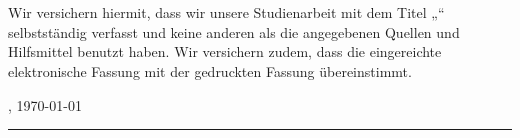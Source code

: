 
\thispagestyle{empty}

\section*{}
\vspace*{2em}

Wir versichern hiermit, dass wir unsere Studienarbeit mit dem Titel „\thesisTitle“ selbstständig verfasst und keine anderen als die angegebenen Quellen und Hilfsmittel benutzt haben. Wir versichern zudem, dass die eingereichte elektronische Fassung mit der gedruckten Fassung übereinstimmt.

\vspace{3em}

\companyLocation, \today
\vspace{4em}

\rule{6cm}{0.4pt}\\
\name
